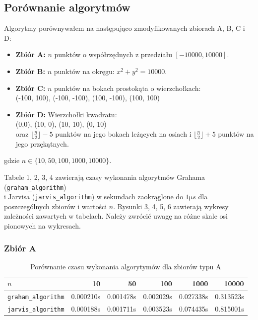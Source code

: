 \documentclass[11pt,a4paper]{article}
\begin{document}
\pagebreak

\subsection{Porównanie algorytmów}
Algorytmy porównywałem na następująco zmodyfikowanych
zbiorach A, B, C i D:
\begin{itemize}
    \item \textbf{Zbiór A:}
    $n$ punktów o współrzędnych
    z przedziału $[-10000, 10000]$.
    \item \textbf{Zbiór B:} 
    $n$ punktów na okręgu: $x^2 + y^2 = 10000$.
    \item \textbf{Zbiór C:}
    $n$ punktów na bokach prostokąta
    o wierzchołkach:\\
    (-100, 100), (-100, -100), (100, -100), (100, 100)
    \item \textbf{Zbiór D:}
    Wierzchołki kwadratu: \\
    (0,0), (10, 0), (10, 10), (0, 10)\\
    oraz $\lfloor \frac{n}{2} \rfloor - 5$ punktów na jego bokach leżących na osiach
    i $\lfloor \frac{n}{2} \rfloor + 5$ punktów na jego przękątnych.
\end{itemize}

gdzie $n\in\{10, 50, 100, 1000, 10000\}$.

Tabele 1, 2, 3, 4 zawierają czasy wykonania algorytmów
Grahama (\verb|graham_algorithm|) \\
i Jarvisa (\verb|jarvis_algorithm|)
w sekundach zaokrąglone do $1\si{\micro s}$ dla poszczególnych
zbiorów i wartości $n$. Rysunki 3, 4, 5, 6 zawierają wykresy zależności
zawartych w tabelach. Należy zwrócić uwagę na różne skale osi pionowych 
na wykresach.

\subsubsection{Zbiór A}
\begin{table}[H]
    \centering
    \begin{tabular}{|l|r|r|r|r|r|}
    \hline
        $n$ & 10 & 50 & 100 & 1000 & 10000 \\ \hline
        \verb|graham_algorithm| & 0.000210s & 0.001478s & 0.002029s & 0.027338s & 0.313523s \\ \hline
        \verb|jarvis_algorithm| & 0.000188s & 0.001711s & 0.003523s & 0.074435s & 0.815001s \\ \hline
    \end{tabular}
    \caption{Porównanie czasu wykonania algorytymów dla zbiorów typu A}
\end{table}
\end{document}
